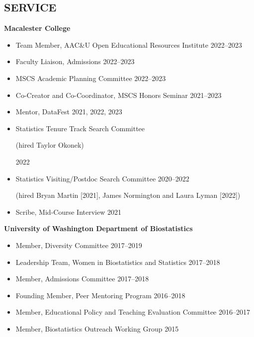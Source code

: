 \documentclass[margin]{res}
\begin{document}
\begin{resume}
\section{SERVICE}  

\textbf{Macalester College}
	\begin{itemize} %
	\item Team Member, AAC\&U Open Educational Resources Institute \hfill 2022--2023
	\item Faculty Liaison, Admissions \hfill 2022--2023 %
	\item MSCS Academic Planning Committee \hfill 2022--2023
	\item Co-Creator and Co-Coordinator, MSCS Honors Seminar \hfill 2021--2023
	\item Mentor, DataFest  \hfill 2021, 2022, 2023
	\item Statistics Tenure Track Search Committee \begin{small}(hired Taylor Okonek)\end{small} \hfill 2022 
	\item Statistics Visiting/Postdoc Search Committee \hfill 2020--2022 \\\begin{small}(hired Bryan Martin [2021], James Normington and Laura Lyman [2022]) \end{small}
	\item Scribe, Mid-Course Interview \hfill 2021
	\end{itemize}


\textbf{University of Washington Department of Biostatistics}
\begin{itemize} %
	\item Member, Diversity Committee \hfill 2017--2019
	\item Leadership Team, Women in Biostatistics and Statistics \hfill 2017--2018
	\item Member, Admissions Committee \hfill 2017--2018
	\item Founding Member, Peer Mentoring Program \hfill 2016--2018
	\item Member, Educational Policy and Teaching Evaluation Committee \hfill 2016--2017
	\item Member, Biostatistics Outreach Working Group \hfill 2015%
\end{itemize}


\end{resume}
\end{document}
